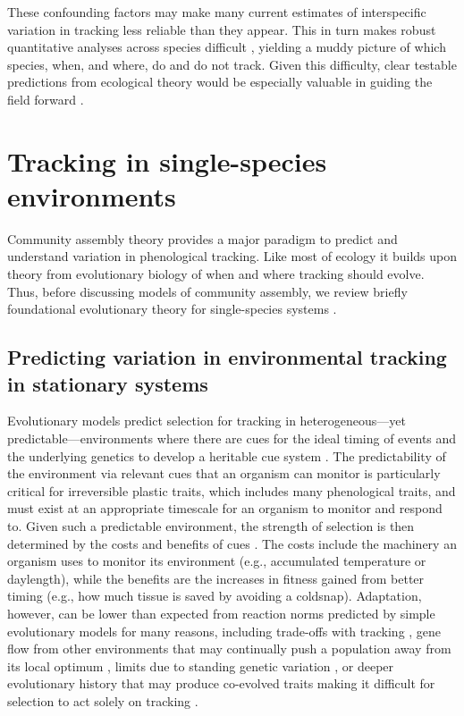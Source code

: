 \documentclass[11pt,letterpaper]{article}
\begin{document}
These confounding factors may make many current estimates of interspecific variation in tracking less reliable than they appear. This in turn makes robust quantitative analyses across species difficult \citep{brown2016,kharouba2018}, yielding a muddy picture of which species, when, and where, do and do not track. Given this difficulty, clear testable predictions from ecological theory would be especially valuable in guiding the field forward \citep{Smaldino2016}.  

\section{Tracking in single-species environments}
Community assembly theory provides a major paradigm to predict and understand variation in phenological tracking. Like most of ecology it builds upon theory from evolutionary biology of when and where tracking should evolve. Thus, before discussing models of community assembly, we review briefly foundational evolutionary theory for single-species systems \citep[where most work has focused, but see][]{Mathias2002,Childs2010,Johansson2015}.

\subsection{Predicting variation in environmental tracking in stationary systems} 
Evolutionary models predict selection for tracking in heterogeneous---yet predictable---environments where there are cues for the ideal timing of events \citep{Piersma:2003wj,reed2010} and the underlying genetics to develop a heritable cue system \citep[tracking is likely strongly heritable, given that many cue systems are themselves heritable, e.g.,][]{vanAsch2007gcb,Wilczek:2010ad}. The predictability of the environment via relevant cues that an organism can monitor is particularly critical for irreversible plastic traits, which includes many phenological traits, and must exist at an appropriate timescale for an organism to monitor and respond to. Given such a predictable environment, the strength of selection is then determined by the costs and benefits of cues \citep{donahue2015}. The costs include the machinery an organism uses to monitor its environment (e.g., accumulated temperature or daylength), while the benefits are the increases in fitness gained from better timing (e.g., how much tissue is saved by avoiding a coldsnap).  Adaptation, however, can be lower than expected from reaction norms predicted by simple evolutionary models for many reasons, including trade-offs with tracking \citep{Singer:2010eb,Johansson2012}, gene flow from other environments that may continually push a population away from its local optimum \citep{lenormand2002}, limits due to standing genetic variation  \citep{Franks:2007wd,ghalambor2015}, or deeper evolutionary history that may produce co-evolved traits making it difficult for selection to act solely on tracking \citep{Ackerly:2009ly}. 
\end{document}
